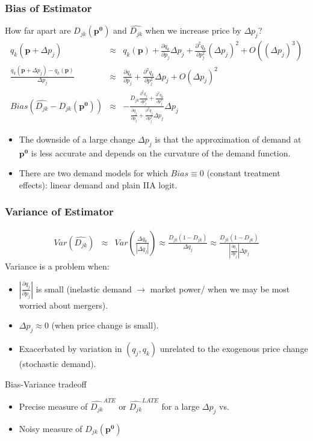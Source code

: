 \documentclass[xcolor=pdftex,dvipsnames,table,mathserif,aspectratio=169]{beamer}
\begin{document}
\begin{frame}
\frametitle{Bias of Estimator}
\footnotesize
How far apart are $D_{jk}(\mathbf{p^0})$ and $\widehat{D_{jk}}$ when we increase price by $\Delta p_j$? 
\begin{eqnarray*}
\nonumber q_k(\mathbf{p}+ \Delta p_j) &\approx& q_k(\mathbf{p}) + \frac{\partial q_k}{\partial p_j} \Delta p_j + \frac{\partial^2 q_k}{\partial p_j^2} (\Delta p_j)^2 + O((\Delta p_j)^3) \\
\frac{ q_k(\mathbf{p}+ \Delta p_j)-q_k(\mathbf{p}) }{\Delta p_j} &\approx& \frac{\partial q_k}{\partial p_j}+ \frac{\partial^2 q_k}{\partial p_j^2} \Delta p_j + O(\Delta p_j)^2 \\
Bias(\widehat{D_{jk}} -D_{jk}(\mathbf{p^0})) &\approx& -  \frac{D_{jk} \frac{\partial^2 q_j}{\partial p_j^2} +  \frac{\partial^2 q_k}{\partial p_j^2} }{\frac{\partial q_j}{\partial p_j} + \frac{\partial^2 q_j}{\partial p_j^2}\Delta p_j } \Delta p_j
\end{eqnarray*}
\begin{itemize}
\item The downside of a large change $\Delta p_j$ is that the approximation of demand at $\mathbf{p^0}$ is less accurate and depends on the curvature of the demand function.
\item There are two demand models for which $Bias \equiv 0$ \alert{(constant treatment effects)}: \pause linear demand and plain IIA logit.
\end{itemize}
\end{frame}

\begin{frame}
\frametitle{Variance of Estimator}
\footnotesize
\begin{eqnarray*}
Var(\widehat{D_{jk} })&\approx& Var\left( \frac{\Delta q_k}{|\Delta q_j|} \right)\approx \frac{D_{jk} (1-D_{jk})}{\Delta q_j} \approx \frac{D_{jk} (1-D_{jk})}{\left| \frac{\partial q_j}{\partial p_j} \right| \Delta p_j}
\end{eqnarray*}
\normalsize
Variance is a problem when:
\begin{itemize}
\item  $\left| \frac{\partial q_j}{\partial p_j} \right| $ is small (inelastic demand $\rightarrow$ market power/ when we may be most worried about mergers).
\item $\Delta p_j \approx 0 $ (when price change is small).
\item Exacerbated by variation in $(q_j,q_k)$ unrelated to the exogenous price change (stochastic demand).
\end{itemize}
Bias-Variance tradeoff
\begin{itemize}
\item Precise measure of $\widehat{D_{jk}}^{ATE}$ or $\widehat{D_{jk}}^{LATE}$ for a large $\Delta p_j$ vs.
\item Noisy measure of $D_{jk}(\mathbf{p^0})$
\end{itemize}
\end{frame}
\end{document}
